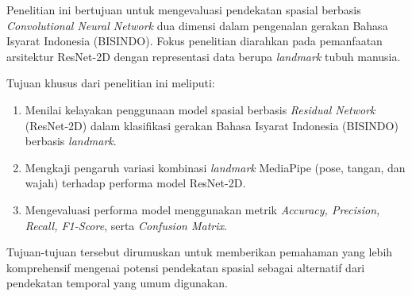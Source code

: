 Penelitian ini bertujuan untuk mengevaluasi pendekatan spasial berbasis \textit{Convolutional Neural Network} dua dimensi dalam pengenalan gerakan Bahasa Isyarat Indonesia (BISINDO). 
Fokus penelitian diarahkan pada pemanfaatan arsitektur ResNet-2D dengan representasi data berupa \textit{landmark} tubuh manusia.

Tujuan khusus dari penelitian ini meliputi:
\begin{enumerate}[noitemsep]
    \item Menilai kelayakan penggunaan model spasial berbasis \textit{Residual Network} (ResNet-2D) dalam klasifikasi gerakan Bahasa Isyarat Indonesia (BISINDO) berbasis \textit{landmark}.
    \item Mengkaji pengaruh variasi kombinasi \textit{landmark} MediaPipe (pose, tangan, dan wajah) terhadap performa model ResNet-2D.
    \item Mengevaluasi performa model menggunakan metrik \textit{Accuracy, Precision, Recall, F1-Score}, serta \textit{Confusion Matrix}.
\end{enumerate} \par

Tujuan-tujuan tersebut dirumuskan untuk memberikan pemahaman yang lebih komprehensif mengenai potensi pendekatan spasial sebagai alternatif dari pendekatan temporal yang umum digunakan.
